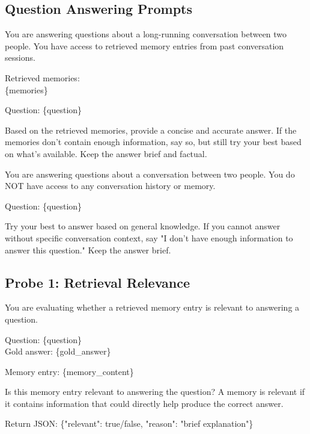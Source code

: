 \documentclass{article} %
\begin{document}
\vspace{0.3cm}

\subsection{Question Answering Prompts}

\begin{tcolorbox}[
  colback=gray!5!white,
  colframe=gray!75!black,
  title=QA With Memory Prompt,
  breakable
]
\small\ttfamily\raggedright
You are answering questions about a long-running conversation between two people. You have access to retrieved memory entries from past conversation sessions.

Retrieved memories:\\
\{memories\}

Question: \{question\}

Based on the retrieved memories, provide a concise and accurate answer. If the memories don't contain enough information, say so, but still try your best based on what's available. Keep the answer brief and factual.
\end{tcolorbox}

\vspace{0.5em}

\begin{tcolorbox}[
  colback=gray!5!white,
  colframe=gray!75!black,
  title=QA Without Memory Prompt (Control Condition),
  breakable
]
\small\ttfamily\raggedright
You are answering questions about a conversation between two people. You do NOT have access to any conversation history or memory.

Question: \{question\}

Try your best to answer based on general knowledge. If you cannot answer without specific conversation context, say "I don't have enough information to answer this question." Keep the answer brief.
\end{tcolorbox}


\vspace{0.3cm}

\subsection{Probe 1: Retrieval Relevance}

\begin{tcolorbox}[
  colback=gray!5!white,
  colframe=gray!75!black,
  title=Relevance Judge Prompt,
  breakable
]
\small\ttfamily\raggedright
You are evaluating whether a retrieved memory entry is relevant to answering a question.

Question: \{question\}\\
Gold answer: \{gold\_answer\}

Memory entry: \{memory\_content\}

Is this memory entry relevant to answering the question? A memory is relevant if it contains information that could directly help produce the correct answer.

Return JSON: \{"relevant": true/false, "reason": "brief explanation"\}
\end{tcolorbox}
\end{document}
